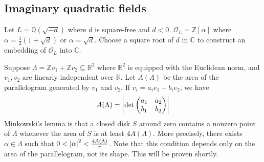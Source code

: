 \subsection{Imaginary quadratic fields}
Let \( L = \mathbb Q(\sqrt{-d}) \) where \( d \) is square-free and \( d < 0 \).
\( \mathcal O_L = \mathbb Z[\alpha] \) where \( \alpha = \frac{1}{2}(1+\sqrt{d}) \) or \( \alpha = \sqrt{d} \).
Choose a square root of \( d \) in \( \mathbb C \) to construct an embedding of \( \mathcal O_L \) into \( \mathbb C \).

Suppose \( \Lambda = \mathbb Z v_1 + \mathbb Z v_2 \subseteq \mathbb R^2 \) where \( \mathbb R^2 \) is equipped with the Euclidean norm, and \( v_1, v_2 \) are linearly independent over \( \mathbb R \).
Let \( A(\Lambda) \) be the area of the parallelogram generated by \( v_1 \) and \( v_2 \).
If \( v_i = a_i e_1 + b_i e_2 \), we have
\[ A(\Lambda) = \abs{\det \begin{pmatrix}
    a_1 & a_2 \\
    b_1 & b_2
\end{pmatrix}} \]
Minkowski's lemma is that a closed disk \( S \) around zero contains a nonzero point of \( \Lambda \) whenever the area of \( S \) is at least \( 4A(\Lambda) \).
More precisely, there exists \( \alpha \in \Lambda \) such that \( 0 < \abs{\alpha}^2 < \frac{4A(\Lambda)}{\pi} \).
Note that this condition depends only on the area of the parallelogram, not its shape.
This will be proven shortly.

